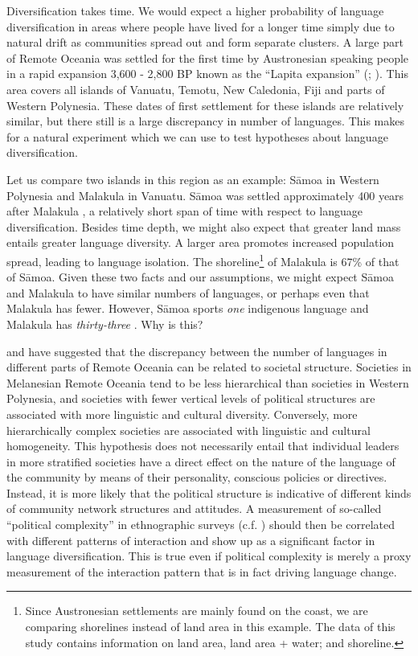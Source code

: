 \documentclass[a4paper,10pt]{article} %
\begin{document}
Diversification takes time. We would expect a higher probability of language diversification in areas where people have lived for a longer time simply due to natural drift as communities spread out and form separate clusters. A large part of Remote Oceania was settled for the first time by Austronesian speaking people in a rapid expansion 3,600 - 2,800 BP known as the ``Lapita expansion'' (\citet[106-7]{bellwood2006austronesians}; \citet[137]{rieth_cochrane_2018}). This area covers all islands of Vanuatu, Temotu, New Caledonia, Fiji and parts of Western Polynesia. These dates of first settlement for these islands are relatively similar, but there still is a large discrepancy in number of languages. This makes for a natural experiment which we can use to test hypotheses about language diversification.

Let us compare two islands in this region as an example: S\={a}moa in Western Polynesia and Malakula in Vanuatu. S\={a}moa was settled approximately 400 years after Malakula  \citep[137-8]{rieth_cochrane_2018}, a relatively short span of time with respect to language diversification. Besides time depth, we might also expect that greater land mass entails greater language diversity. A larger area promotes increased population spread, leading to language isolation. The shoreline\footnote{Since Austronesian settlements are mainly found on the coast, we are comparing shorelines instead of land area in this example. The data of this study contains information on land area, land area + water; and shoreline.} of Malakula is 67\% of that of S\={a}moa. Given these two facts and our assumptions, we might expect S\={a}moa and Malakula to have similar numbers of languages, or perhaps even that Malakula has fewer. However, S\={a}moa sports \emph{one} indigenous language and Malakula has \emph{thirty-three} \citep{glottolog40}. Why is this?


\citet{turner1884} and \citet{pawley81,pawley2007} have suggested that the discrepancy between the number of languages in different parts of Remote Oceania can be related to societal structure. Societies in Melanesian Remote Oceania tend to be less hierarchical than societies in Western Polynesia, and societies with fewer vertical levels of political structures are associated with more linguistic and cultural diversity. Conversely, more hierarchically complex societies are associated with linguistic and cultural homogeneity. This hypothesis does not necessarily entail that individual leaders in more stratified societies have a direct effect on the nature of the language of the community by means of their personality, conscious policies or directives. Instead, it is more likely that the political structure is indicative of different kinds of community network structures and attitudes. A measurement of so-called ``political complexity'' in ethnographic surveys (c.f. \citet{gray1998ethnographic}) should then be correlated with different patterns of interaction and show up as a significant factor in language diversification. This is true even if political complexity is merely a proxy measurement of the interaction pattern that is in fact driving language change. 
\end{document}
